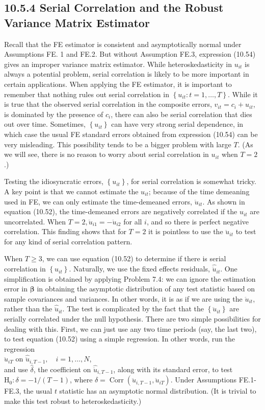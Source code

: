 \documentclass[10pt]{article}
\begin{document}
\subsection*{10.5.4 Serial Correlation and the Robust Variance Matrix Estimator}
Recall that the FE estimator is consistent and asymptotically normal under Assumptions FE. 1 and FE.2. But without Assumption FE.3, expression (10.54) gives an improper variance matrix estimator. While heteroskedasticity in $u_{i t}$ is always a potential problem, serial correlation is likely to be more important in certain applications. When applying the FE estimator, it is important to remember that nothing rules out serial correlation in $\left\{u_{i t}: t=1, \ldots, T\right\}$. While it is true that the observed serial correlation in the composite errors, $v_{i t}=c_{i}+u_{i t}$, is dominated by the presence of $c_{i}$, there can also be serial correlation that dies out over time. Sometimes, $\left\{u_{i t}\right\}$ can have very strong serial dependence, in which case the usual FE standard errors obtained from expression (10.54) can be very misleading. This possibility tends to be a bigger problem with large $T$. (As we will see, there is no reason to worry about serial correlation in $u_{i t}$ when $T=2$.)

Testing the idiosyncratic errors, $\left\{u_{i t}\right\}$, for serial correlation is somewhat tricky. A key point is that we cannot estimate the $u_{i t}$; because of the time demeaning used in FE, we can only estimate the time-demeaned errors, $\ddot{u}_{i t}$. As shown in equation (10.52), the time-demeaned errors are negatively correlated if the $u_{i t}$ are uncorrelated. When $T=2, \ddot{u}_{i 1}=-\ddot{u}_{i 2}$ for all $i$, and so there is perfect negative correlation. This finding shows that for $T=2$ it is pointless to use the $\ddot{u}_{i t}$ to test for any kind of serial correlation pattern.

When $T \geq 3$, we can use equation (10.52) to determine if there is serial correlation in $\left\{u_{i t}\right\}$. Naturally, we use the fixed effects residuals, $\hat{\ddot{u}}_{i t}$. One simplification is obtained by applying Problem 7.4: we can ignore the estimation error in $\boldsymbol{\beta}$ in obtaining the asymptotic distribution of any test statistic based on sample covariances and variances. In other words, it is as if we are using the $\ddot{u}_{i t}$, rather than the $\hat{\ddot{u}}_{i t}$. The test is complicated by the fact that the $\left\{\ddot{u}_{i t}\right\}$ are serially correlated under the null hypothesis. There are two simple possibilities for dealing with this. First, we can just use any two time periods (say, the last two), to test equation (10.52) using a simple regression. In other words, run the regression\\
$\hat{\ddot{u}}_{i T}$ on $\hat{\ddot{u}}_{i, T-1}, \quad i=1, \ldots, N$,\\
and use $\hat{\delta}$, the coefficient on $\hat{\ddot{u}}_{i, T-1}$, along with its standard error, to test $\mathrm{H}_{0}: \delta= -1 /(T-1)$, where $\delta=\operatorname{Corr}\left(\ddot{u}_{i, T-1}, \ddot{u}_{i T}\right)$. Under Assumptions FE.1-FE.3, the usual $t$ statistic has an asymptotic normal distribution. (It is trivial to make this test robust to heteroskedasticity.)
\end{document}
